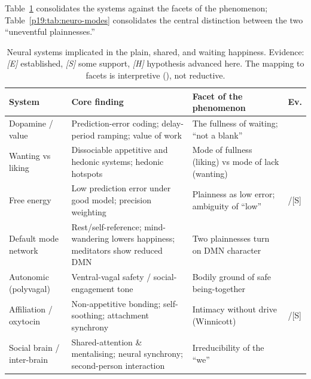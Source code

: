 Table~\ref{p19:tab:neuro-systems} consolidates the systems against the facets of the phenomenon; Table~\ref{p19:tab:neuro-modes} consolidates the central distinction between the two ``uneventful plainnesses.''

\begin{table}[t]
\caption{Neural systems implicated in the plain, shared, and waiting happiness. Evidence: \emph{[E]} established, \emph{[S]} some support, \emph{[H]} hypothesis advanced here. The mapping to facets is interpretive (), not reductive.}
\label{p19:tab:neuro-systems}
\small
\begin{tabularx}{\linewidth}{>{\RaggedRight\arraybackslash}p{2.6cm} >{\RaggedRight\arraybackslash}p{3.5cm} >{\RaggedRight\arraybackslash}X >{\centering\arraybackslash}p{1.0cm}}
\toprule
\textbf{System} & \textbf{Core finding} & \textbf{Facet of the phenomenon} & \textbf{Ev.} \\
\midrule
Dopamine / value & Prediction-error coding; delay-period ramping; value of work & The fullness of waiting; ``not a blank'' & [E] \\
Wanting vs liking & Dissociable appetitive and hedonic systems; hedonic hotspots & Mode of fullness (liking) vs mode of lack (wanting) & [E] \\
Free energy & Low prediction error under good model; precision weighting & Plainness as low error; ambiguity of ``low'' & [E]/[S] \\
Default mode network & Rest/self-reference; mind-wandering lowers happiness; meditators show reduced DMN & Two plainnesses turn on DMN character & [E] \\
Autonomic (polyvagal) & Ventral-vagal safety / social-engagement tone & Bodily ground of safe being-together & [S] \\
Affiliation / oxytocin & Non-appetitive bonding; self-soothing; attachment synchrony & Intimacy without drive (Winnicott) & [E]/[S] \\
Social brain / inter-brain & Shared-attention \& mentalising; neural synchrony; second-person interaction & Irreducibility of the ``we'' & [S] \\
\bottomrule
\end{tabularx}
\end{table}

